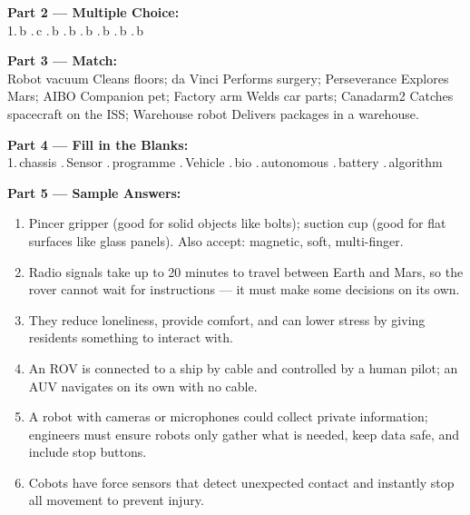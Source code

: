 \vspace{6pt}
\textbf{Part 2 --- Multiple Choice:}\\
1.\,b .\,c .\,b .\,b .\,b .\,b .\,b .\,b

\vspace{6pt}
\textbf{Part 3 --- Match:}\\
Robot vacuum \textrightarrow{} Cleans floors;
da Vinci \textrightarrow{} Performs surgery;
Perseverance \textrightarrow{} Explores Mars;
AIBO \textrightarrow{} Companion pet;
Factory arm \textrightarrow{} Welds car parts;
Canadarm2 \textrightarrow{} Catches spacecraft on the ISS;
Warehouse robot \textrightarrow{} Delivers packages in a warehouse.

\vspace{6pt}
\textbf{Part 4 --- Fill in the Blanks:}\\
1.\,chassis .\,Sensor .\,programme .\,Vehicle .\,bio .\,autonomous .\,battery .\,algorithm

\vspace{6pt}
\textbf{Part 5 --- Sample Answers:}
\begin{enumerate}
  \item Pincer gripper (good for solid objects like bolts); suction cup (good for flat surfaces like glass panels). Also accept: magnetic, soft, multi-finger.
  \item Radio signals take up to 20 minutes to travel between Earth and Mars, so the rover cannot wait for instructions --- it must make some decisions on its own.
  \item They reduce loneliness, provide comfort, and can lower stress by giving residents something to interact with.
  \item An ROV is connected to a ship by cable and controlled by a human pilot; an AUV navigates on its own with no cable.
  \item A robot with cameras or microphones could collect private information; engineers must ensure robots only gather what is needed, keep data safe, and include stop buttons.
  \item Cobots have force sensors that detect unexpected contact and instantly stop all movement to prevent injury.
\end{enumerate}
